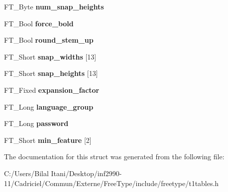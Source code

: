 \begin{DoxyCompactItemize}
\item 
F\+T\+\_\+\+Byte {\bfseries num\+\_\+snap\+\_\+heights}\hypertarget{struct_p_s___private_rec___a53f7cfd204400a00eb7203b67d6a1b1c}{}\label{struct_p_s___private_rec___a53f7cfd204400a00eb7203b67d6a1b1c}

\item 
F\+T\+\_\+\+Bool {\bfseries force\+\_\+bold}\hypertarget{struct_p_s___private_rec___a40e62a278e48f47a0f204bd9fa5c883f}{}\label{struct_p_s___private_rec___a40e62a278e48f47a0f204bd9fa5c883f}

\item 
F\+T\+\_\+\+Bool {\bfseries round\+\_\+stem\+\_\+up}\hypertarget{struct_p_s___private_rec___a96b9729811d02146a87ffdc5c254bbe9}{}\label{struct_p_s___private_rec___a96b9729811d02146a87ffdc5c254bbe9}

\item 
F\+T\+\_\+\+Short {\bfseries snap\+\_\+widths} \mbox{[}13\mbox{]}\hypertarget{struct_p_s___private_rec___a39cf1a4b21280bf8082ccba0f4824a8a}{}\label{struct_p_s___private_rec___a39cf1a4b21280bf8082ccba0f4824a8a}

\item 
F\+T\+\_\+\+Short {\bfseries snap\+\_\+heights} \mbox{[}13\mbox{]}\hypertarget{struct_p_s___private_rec___a3583caf0cc05de2afac098574ed0bc4b}{}\label{struct_p_s___private_rec___a3583caf0cc05de2afac098574ed0bc4b}

\item 
F\+T\+\_\+\+Fixed {\bfseries expansion\+\_\+factor}\hypertarget{struct_p_s___private_rec___a45cf6e07c4c26f029e66998e6cad9fa0}{}\label{struct_p_s___private_rec___a45cf6e07c4c26f029e66998e6cad9fa0}

\item 
F\+T\+\_\+\+Long {\bfseries language\+\_\+group}\hypertarget{struct_p_s___private_rec___afc2a7f950a174577ebfc062bb1598f5c}{}\label{struct_p_s___private_rec___afc2a7f950a174577ebfc062bb1598f5c}

\item 
F\+T\+\_\+\+Long {\bfseries password}\hypertarget{struct_p_s___private_rec___a309a871cdeb6f658d8fbff23fa13b667}{}\label{struct_p_s___private_rec___a309a871cdeb6f658d8fbff23fa13b667}

\item 
F\+T\+\_\+\+Short {\bfseries min\+\_\+feature} \mbox{[}2\mbox{]}\hypertarget{struct_p_s___private_rec___af8c829e03c424b1f12b2c9cd4041a868}{}\label{struct_p_s___private_rec___af8c829e03c424b1f12b2c9cd4041a868}

\end{DoxyCompactItemize}


The documentation for this struct was generated from the following file\+:\begin{DoxyCompactItemize}
\item 
C\+:/\+Users/\+Bilal Itani/\+Desktop/inf2990-\/11/\+Cadriciel/\+Commun/\+Externe/\+Free\+Type/include/freetype/t1tables.\+h\end{DoxyCompactItemize}
